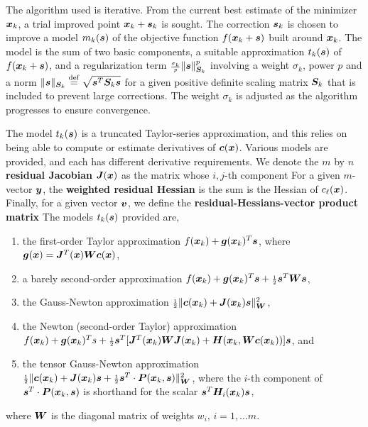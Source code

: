 \documentclass{galahad}
\begin{document}

\galterminology
The algorithm used is iterative. From the current best estimate
of the minimizer ${\bm{x}}_k$, a trial improved point ${\bm{x}}_k + {\bm{s}}_k$ is sought.
The correction ${\bm{s}}_k$ is chosen to improve a model $m_k({\bm{s}})$ of
the objective function $f({\bm{x}}_k+{\bm{s}})$ built around
${\bm{x}}_k$. The model is the sum of two basic components,
a suitable approximation $t_k({\bm{s}})$ of $f({\bm{x}}_k+{\bm{s}})$,
and a regularization term ${\scriptstyle \frac{\sigma_k}{p}} \|{\bm{s}}\|_{{\bm{S}}_k}^p$
involving a weight $\sigma_k$, power $p$ and
a norm $\|{\bm{s}}\|_{{\bm{S}}_k} \stackrel{\rm def}{=} \sqrt{{\bm{s}}^T {\bm{S}}_k {\bm{s}}}$ for a given positive
definite scaling matrix ${\bm{S}}_k$ that is included to prevent large corrections.
The weight  $\sigma_k$ is adjusted as the algorithm progresses to
ensure convergence.

The model $t_k({\bm{s}})$ is a truncated Taylor-series approximation, and this
relies on being able to compute or estimate derivatives of ${\bm{c}}({\bm{x}})$.
Various models are provided, and each has different derivative requirements.
We denote the $m$ by $n$ {\bf residual Jacobian} ${\bm{J}}({\bm{x}})$ as the matrix
whose $i,j$-th component
For a given $m$-vector ${\bm{y}}$, the
{\bf weighted residual Hessian} is the sum
is the Hessian of $c_\ell({\bm{x}})$.
Finally, for a given vector ${\bm{v}}$, we define
the {\bf residual-Hessians-vector product matrix}
The models $t_k({\bm{s}})$ provided are,
\begin{enumerate}
\item the first-order Taylor approximation $f({\bm{x}}_k) + {\bm{g}}({\bm{x}}_k)^T {\bm{s}}$,
where
${\bm{g}}({\bm{x}}) = {\bm{J}}^T({\bm{x}}) {\bm{W}} {\bm{c}}({\bm{x}})$,
\item a barely second-order approximation
$f({\bm{x}}_k) + {\bm{g}}({\bm{x}}_k)^T {\bm{s}} + {\scriptstyle \frac{1}{2}} {\bm{s}}^T {\bm{W}} {\bm{s}}$,
\item the Gauss-Newton approximation
${\scriptstyle \frac{1}{2}} \| {\bm{c}}({\bm{x}}_k) + {\bm{J}}({\bm{x}}_k) {\bm{s}}\|_{{\bm{W}}}^2$,
\item the Newton (second-order Taylor) approximation
  $f({\bm{x}}_k) + {\bm{g}}({\bm{x}}_k)^T s + {\scriptstyle \frac{1}{2}} {\bm{s}}^T
  [ {\bm{J}}^T({\bm{x}}_k) {\bm{W}} {\bm{J}}({\bm{x}}_k) +
{\bm{H}}({\bm{x}}_k,{\bm{W}} {\bm{c}}({\bm{x}}_k))] {\bm{s}}$, and
\item the tensor Gauss-Newton approximation
${\scriptstyle \frac{1}{2}} \| {\bm{c}}({\bm{x}}_k) + {\bm{J}}({\bm{x}}_k) {\bm{s}} +
 {\scriptstyle \frac{1}{2}} {\bm{s}}^T \cdot {\bm{P}}({\bm{x}}_k,{\bm{s}}) \|_{{\bm{W}}}^2$,
where the $i$-th component of ${\bm{s}}^T \cdot {\bm{P}}({\bm{x}}_k,{\bm{s}})$ is
shorthand for the scalar ${\bm{s}}^T {\bm{H}}_i({\bm{x}}_k) {\bm{s}}$,
\end{enumerate}
where ${\bm{W}}$ is the diagonal matrix of weights $w_i$, $i = 1, \ldots m$.
\end{document}
